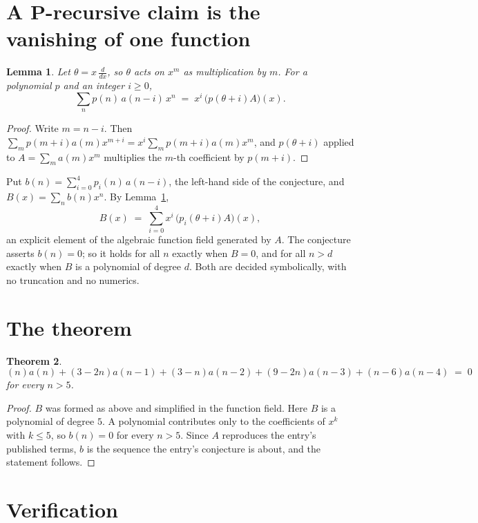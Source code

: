 \documentclass[11pt,a4paper]{article}
\theoremstyle{plain}
\newtheorem{theorem}{Theorem}
\newtheorem{lemma}[theorem]{Lemma}
\theoremstyle{definition}
\begin{document}
\section{A P-recursive claim is the vanishing of one function}

\begin{lemma}\label{lem:theta}
Let $\theta=x\,\frac{d}{dx}$, so $\theta$ acts on $x^m$ as multiplication by $m$. For a
polynomial $p$ and an integer $i\ge0$,
\[
\sum_{n} p(n)\,a(n-i)\,x^{n}\;=\;x^{i}\,\bigl(p(\theta+i)A\bigr)(x).
\]
\end{lemma}

\begin{proof}
Write $m=n-i$. Then $\sum_m p(m+i)a(m)x^{m+i}=x^i\sum_m p(m+i)a(m)x^m$, and $p(\theta+i)$
applied to $A=\sum_m a(m)x^m$ multiplies the $m$-th coefficient by $p(m+i)$.
\end{proof}

Put $b(n)=\sum_{i=0}^{4}p_i(n)\,a(n-i)$, the left-hand side of the conjecture, and
$B(x)=\sum_n b(n)x^n$. By Lemma~\ref{lem:theta},
\[
B(x)\;=\;\sum_{i=0}^{4}x^{i}\,\bigl(p_i(\theta+i)A\bigr)(x),
\]
an explicit element of the algebraic function field generated by $A$. The conjecture asserts
$b(n)=0$; so it holds for all $n$ exactly when $B=0$, and for all $n>d$ exactly when $B$ is a
polynomial of degree $d$. Both are decided symbolically, with no truncation and no numerics.

\section{The theorem}

\begin{theorem}
\[
\left(n\right)a(n) + \left(3 - 2 n\right)a(n-1) + \left(3 - n\right)a(n-2) + \left(9 - 2 n\right)a(n-3) + \left(n - 6\right)a(n-4)\;=\;0
\]
for every $n>5$.
\end{theorem}

\begin{proof}
$B$ was formed as above and simplified in the function field. Here $B$ is a polynomial of degree $5$. A polynomial contributes only to the coefficients of $x^k$ with $k\le5$, so $b(n)=0$ for every $n>5$. Since $A$ reproduces the
entry's published terms, $b$ is the sequence the entry's conjecture is about, and the statement
follows.
\end{proof}

\section{Verification}
\end{document}
